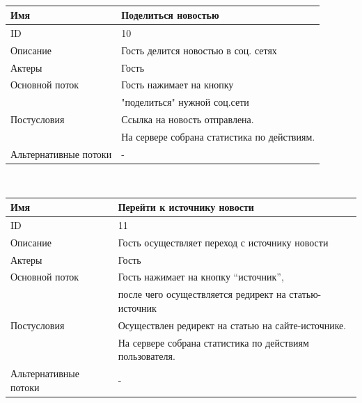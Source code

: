\begin{center}
\begin{tabular}{|l|l|}
        \hline
    \end{tabular}\\
    \vspace{0.5cm}
    \begin{tabular}{|l|l|}
        \hline
        Имя                   & Поделиться новостью                         \\
        \hline
        ID                    & 10                                          \\
        \hline
        Описание              & Гость делится новостью в соц. сетях         \\
        \hline
        Актеры                & Гость                                       \\
        \hline
        Основной поток        & Гость нажимает на кнопку                    \\
        & "поделиться" нужной соц.сети                \\
        \hline
        Постусловия           & Ссылка на новость отправлена.               \\
        & На сервере собрана статистика по действиям. \\
        \hline
        Альтернативные потоки & -                                           \\
        \hline
    \end{tabular}\\
    \vspace{0.5cm}
    \begin{tabular}{|l|l|}
        \hline
        Имя                   & Перейти к источнику новости                              \\
        \hline
        ID                    & 11                                                       \\
        \hline
        Описание              & Гость осуществляет переход с источнику новости           \\
        \hline
        Актеры                & Гость                                                    \\
        \hline
        Основной поток        & Гость нажимает на кнопку “источник”,                     \\
        & после чего осуществляется редирект на статью-источник    \\
        \hline
        Постусловия           & Осуществлен редирект на статью на сайте-источнике.       \\
        & На сервере собрана статистика по действиям пользователя. \\
        \hline
        Альтернативные потоки & -                                                        \\
        \hline
    \end{tabular}\\
\end{center}
